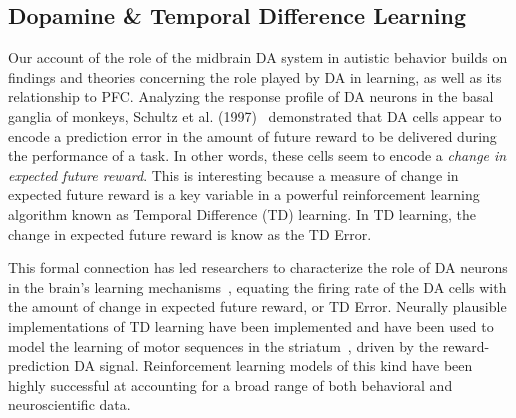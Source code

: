 \subsection{Dopamine \& Temporal Difference Learning}
Our account of the role of the midbrain DA system in autistic behavior builds on findings and theories concerning the role played by DA in learning, as well as its relationship to PFC. Analyzing the response profile of DA neurons in the basal ganglia of monkeys, Schultz et al. (1997)~\nocite{schultz97td} demonstrated that DA cells appear to encode a prediction error in the amount of future reward to be delivered during the performance of a task. In other words, these cells seem to encode a \emph{change in expected future reward}. This is interesting because a measure of change in expected future reward is a key variable in a powerful reinforcement learning algorithm known as Temporal Difference (TD) learning. In TD learning, the change in expected future reward is know as the TD Error. %


This formal connection has led researchers to characterize the role of DA neurons in the brain's learning mechanisms~\cite{BartoAG:1994:TDLearning,MontaguePR:1996:Dopamine}, equating the firing rate of the DA cells with the amount of change in expected future reward, or TD Error. Neurally plausible implementations of TD learning have been implemented and have been used to model the learning of motor sequences in the striatum~\cite{MontaguePR:1996:Dopamine}, driven by the reward-prediction DA signal. Reinforcement learning models of this kind have been highly successful at accounting for a broad range of both behavioral and neuroscientific data.%


